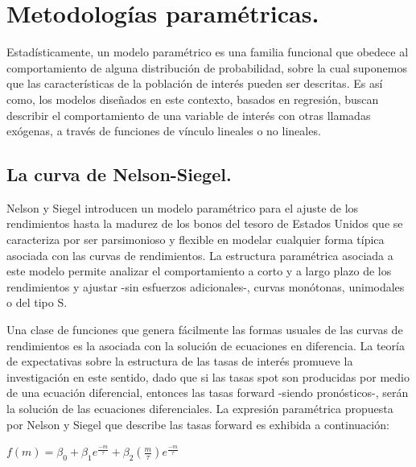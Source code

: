 \section{Metodolog\'ias param\'etricas.}

\hspace*{0.4 cm} Estad\'isticamente, un modelo param\'etrico es una familia funcional que
obedece al comportamiento de alguna distribuci\'on de probabilidad, sobre la cual suponemos que las caracter\'isticas de la poblaci\'on de inter\'es
pueden ser descritas. Es as\'i como, los modelos dise\~nados en este contexto,
basados en regresi\'on, buscan describir el comportamiento de una
variable de inter\'es con otras llamadas ex\'ogenas, a trav\'es de funciones de
v\'inculo lineales o no lineales.

\subsection{La curva de Nelson-Siegel.\\} 

\hspace*{0.4 cm} Nelson y Siegel \cite{NS} introducen un modelo param\'etrico para el ajuste
de los rendimientos hasta la madurez de los bonos del tesoro de Estados
Unidos que se caracteriza por ser parsimonioso y flexible en modelar
cualquier forma t\'ipica asociada con las curvas de rendimientos. La estructura
param\'etrica asociada a este modelo permite analizar el comportamiento
a corto y a largo plazo de los rendimientos y ajustar -sin
esfuerzos adicionales-, curvas mon\'otonas, unimodales o del tipo S.


\hspace*{0.4 cm} Una clase de funciones que genera f\'acilmente las formas usuales de las
curvas de rendimientos es la asociada con la soluci\'on de ecuaciones en
diferencia. La teor\'ia de expectativas sobre la estructura de las tasas de
inter\'es promueve la investigaci\'on en este sentido, dado que si las tasas
spot son producidas por medio de una ecuaci\'on diferencial, entonces las
tasas forward -siendo pron\'osticos-, ser\'an la soluci\'on de las ecuaciones
diferenciales. La expresi\'on param\'etrica propuesta por Nelson y Siegel
\cite{NS} que describe las tasas forward es exhibida a continuaci\'on:


\begin{center}
$\displaystyle{f(m) = \beta_{0} + \beta_{1} e^{\frac{-m}{\tau}} +\beta_{2} \left(\frac{m}{\tau}\right)e^{\frac{-m}{\tau}}}$
\end{center}


